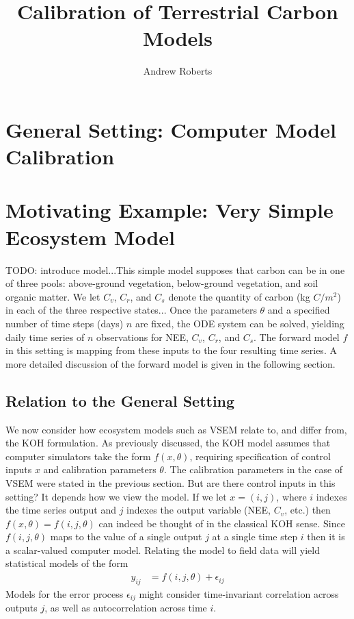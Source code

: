 \documentclass[12pt]{article}
\title{Calibration of Terrestrial Carbon Models}
\author{Andrew Roberts}
\begin{document}
\maketitle
\tableofcontents
\newpage

\section{General Setting: Computer Model Calibration}
\section{Motivating Example: Very Simple Ecosystem Model}
TODO: introduce model...This simple model supposes that carbon can be in one of three pools: above-ground vegetation, below-ground vegetation, and 
soil organic matter. We let $C_v$, $C_r$, and $C_s$ denote the quantity of carbon (kg $C/m^2$) in each of the three respective states... 
Once the parameters $\theta$ and a specified number of time steps (days) $n$ are fixed, the ODE system can be solved, yielding daily time series of $n$
observations for NEE, $C_v$, $C_r$, and $C_s$. The forward model $f$ in this setting is mapping from these inputs to the four resulting time series. A more 
detailed discussion of the forward model is given in the following section. 

\subsection{Relation to the General Setting}
We now consider how ecosystem models such as VSEM relate to, and differ from, the KOH formulation. As previously discussed, the KOH model assumes that
computer simulators take the form $f(x, \theta)$, requiring specification of control inputs $x$ and calibration parameters $\theta$. The calibration parameters 
in the case of VSEM were stated in the previous section. But are there control inputs in this setting? It depends how we view the model. If we let 
$x = (i, j)$, where $i$ indexes the time series output and $j$ indexes the output variable (NEE, $C_v$, etc.) then $f(x, \theta) = f(i, j, \theta)$ can indeed be thought of in the 
classical KOH sense. Since $f(i, j, \theta)$ maps to the value of a single output $j$ at a single time step $i$ then it is a scalar-valued computer model. Relating the 
model to field data will yield statistical models of the form 
\begin{align}
y_{ij} &= f(i, j, \theta) + \epsilon_{ij}
\end{align}
Models for the error process $\epsilon_{ij}$ might consider time-invariant correlation across outputs $j$, as well as autocorrelation across time $i$. 
\end{document}
